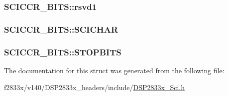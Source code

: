 \subsubsection[{rsvd1}]{ S\+C\+I\+C\+C\+R\+\_\+\+B\+I\+T\+S\+::rsvd1}\label{struct_s_c_i_c_c_r___b_i_t_s_a275dcf6ed62e2493422fea302f0346c4}
\hypertarget{struct_s_c_i_c_c_r___b_i_t_s_a5905dc933eca9a6642fec892cd535c13}{}
\subsubsection[{S\+C\+I\+C\+H\+A\+R}]{ S\+C\+I\+C\+C\+R\+\_\+\+B\+I\+T\+S\+::\+S\+C\+I\+C\+H\+A\+R}\label{struct_s_c_i_c_c_r___b_i_t_s_a5905dc933eca9a6642fec892cd535c13}
\hypertarget{struct_s_c_i_c_c_r___b_i_t_s_ac25e8cbd01da3fd64d1c2848c6706020}{}
\subsubsection[{S\+T\+O\+P\+B\+I\+T\+S}]{ S\+C\+I\+C\+C\+R\+\_\+\+B\+I\+T\+S\+::\+S\+T\+O\+P\+B\+I\+T\+S}\label{struct_s_c_i_c_c_r___b_i_t_s_ac25e8cbd01da3fd64d1c2848c6706020}


The documentation for this struct was generated from the following file\+:\begin{DoxyCompactItemize}
\item 
f2833x/v140/\+D\+S\+P2833x\+\_\+headers/include/\hyperlink{_d_s_p2833x___sci_8h}{D\+S\+P2833x\+\_\+\+Sci.\+h}\end{DoxyCompactItemize}
